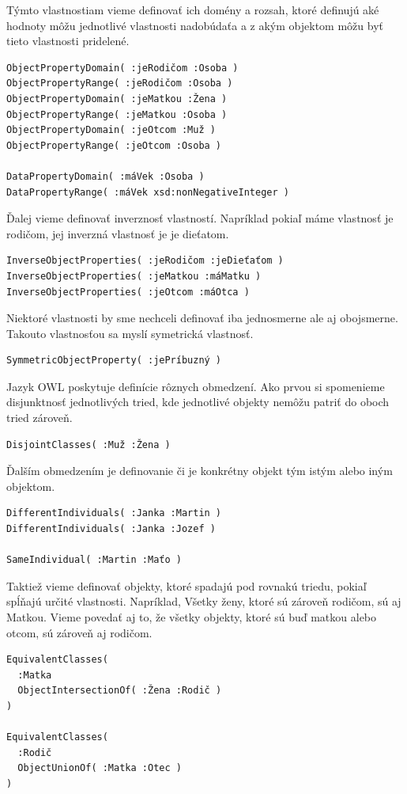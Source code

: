 \documentclass[12pt, a4paper, oneside]{book}
\begin{document}


Týmto vlastnostiam vieme definovať ich domény a rozsah, ktoré definujú aké hodnoty môžu jednotlivé vlastnosti nadobúdaťa a z akým objektom môžu byť tieto vlastnosti pridelené.
\begin{verbatim}
ObjectPropertyDomain( :jeRodičom :Osoba )
ObjectPropertyRange( :jeRodičom :Osoba )
ObjectPropertyDomain( :jeMatkou :Žena )
ObjectPropertyRange( :jeMatkou :Osoba )
ObjectPropertyDomain( :jeOtcom :Muž )
ObjectPropertyRange( :jeOtcom :Osoba )

DataPropertyDomain( :máVek :Osoba ) 
DataPropertyRange( :máVek xsd:nonNegativeInteger ) 
\end{verbatim}


Ďalej vieme definovať inverznosť vlastností. Napríklad pokiaľ máme vlastnosť je rodičom, jej inverzná vlastnosť je je dieťatom.
\begin{verbatim}
InverseObjectProperties( :jeRodičom :jeDieťaťom )
InverseObjectProperties( :jeMatkou :máMatku )
InverseObjectProperties( :jeOtcom :máOtca )
\end{verbatim}


Niektoré vlastnosti by sme nechceli definovať iba jednosmerne ale aj obojsmerne. Takouto vlastnosťou sa myslí symetrická vlastnosť.
\begin{verbatim}
SymmetricObjectProperty( :jePríbuzný )
\end{verbatim}


Jazyk OWL poskytuje definície rôznych obmedzení. Ako prvou si spomenieme disjunktnosť jednotlivých tried, kde jednotlivé objekty nemôžu patriť do oboch tried zároveň.
\begin{verbatim}
DisjointClasses( :Muž :Žena )
\end{verbatim}


Ďalším obmedzením je definovanie či je konkrétny objekt tým istým alebo iným objektom.
\begin{verbatim}
DifferentIndividuals( :Janka :Martin )
DifferentIndividuals( :Janka :Jozef )

SameIndividual( :Martin :Maťo )
\end{verbatim}


Taktiež vieme definovať objekty, ktoré spadajú pod rovnakú triedu, pokiaľ spĺňajú určité vlastnosti. Napríklad, Všetky ženy, ktoré sú zároveň rodičom, sú aj Matkou. Vieme povedať aj to, že všetky objekty, ktoré sú buď matkou alebo otcom, sú zároveň aj rodičom.
\begin{verbatim}
EquivalentClasses(
  :Matka 
  ObjectIntersectionOf( :Žena :Rodič )
) 

EquivalentClasses(
  :Rodič 
  ObjectUnionOf( :Matka :Otec )
) 
\end{verbatim}
\end{document}
